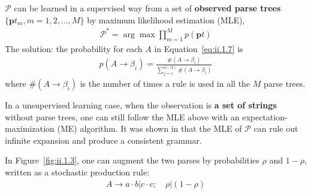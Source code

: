 \documentclass[10pt,oneside]{book}
\newcommand{\Eq}[1]{Equation~\ref{eq:#1}}
\newcommand{\Fig}[1]{Figure~\ref{fig:#1}}
\begin{document}
$\mathcal{P}$ can be learned in a supervised way from a set of
\textbf{observed parse trees} $\{\mathbf{p} t_m, m = 1, 2, \text{\ldots}, M\}$
by maximum likelihood estimation (MLE),
%
\begin{align}
  \label{eq:ii.1.12}
  \tag{1.12}
  \mathcal{P^*} = \arg \max \prod^M_{m=1} p(\mathbf{p}t)
\end{align}
%
The solution: the probability for each $A$ in \Eq{ii.1.7} is
%
\begin{align}
  \label{eq:ii.1.13}
  \tag{1.13}
  p(A \rightarrow \beta_i) = \frac{\#(A \rightarrow \beta_i)}{\sum^{n(A)}_{j=1} \#(A \rightarrow \beta_i)}
\end{align}
%
where $\#(A \rightarrow \beta_i)$ is the number of times a rule is used in all
the $M$ parse trees.

In a unsupervised learning case, when the observation is
\textbf{a set of strings} without parse trees, one can still follow the MLE
above with an expectation-maximization (ME) algorithm. It was shown
in\cite{zhiyichi1998} that the MLE of $\mathcal{P}$ can rule out infinite
expansion and produce a consistent grammar.

In \Fig{ii.1.3}, one can augment the two parses by probabilities $\rho$ and
$1 - \rho$, written as a stochastic production rule:
%
\begin{align}
  \label{eq:ii.1.14}
  \tag{1.14}
  A \rightarrow a \cdot b \vert c \cdot c; \quad \rho \vert (1 - \rho)
\end{align}
%



\end{document}
